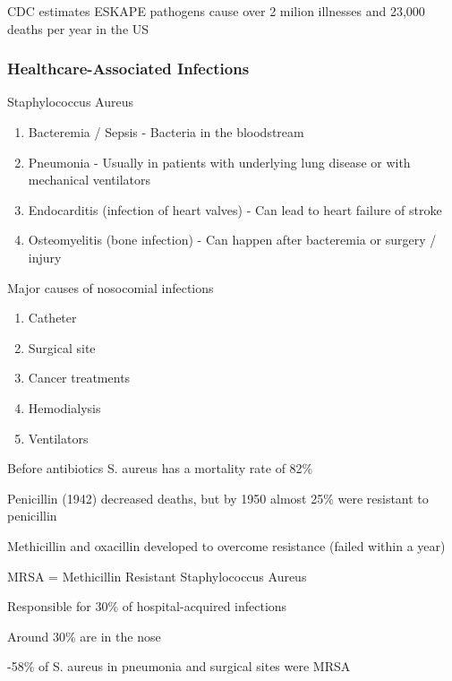 \documentclass{notes}
\begin{document}
CDC estimates ESKAPE pathogens cause over 2 milion illnesses and 23,000 deaths per year in the US

\subsubsection*{Healthcare-Associated Infections}
Staphylococcus Aureus

\begin{enumerate}
    \item Bacteremia / Sepsis - Bacteria in the bloodstream
    \item Pneumonia - Usually in patients with underlying lung disease or with mechanical ventilators
    \item Endocarditis (infection of heart valves) - Can lead to heart failure of stroke
    \item Osteomyelitis (bone infection) - Can happen after bacteremia or surgery / injury
\end{enumerate}

Major causes of nosocomial infections
\begin{enumerate}
    \item Catheter
    \item Surgical site
    \item Cancer treatments
    \item Hemodialysis
    \item Ventilators
\end{enumerate}

Before antibiotics S. aureus has a mortality rate of 82\%

Penicillin (1942) decreased deaths, but by 1950 almost 25\% were resistant to penicillin

Methicillin and oxacillin developed to overcome resistance (failed within a year)

MRSA = Methicillin Resistant Staphylococcus Aureus

\tab \indicates Responsible for 30\% of hospital-acquired infections

\tab \indicates Around 30\% are in the nose

\tab {}-58\% of S. aureus in pneumonia and surgical sites were MRSA
\end{document}
